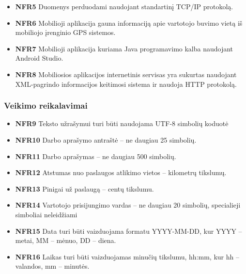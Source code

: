 \documentclass{VUMIFPSbakalaurinis}
\begin{document}
\begin{itemize}
	\item \textbf{NFR5} Duomenys perduodami naudojant standartinį TCP/IP protokolą.
\end{itemize}

\begin{itemize}
	\item \textbf{NFR6} Mobilioji aplikacija gauna informaciją apie vartotojo buvimo vietą iš mobiliojo įrenginio GPS sistemos.
\end{itemize}

\begin{itemize}
	\item \textbf{NFR7} Mobilioji aplikacija kuriama Java programavimo kalba naudojant Android Studio.
	\item \textbf{NFR8} Mobiliosios aplikacijos internetinis servisas yra sukurtas naudojant XML-pagrindo informacijos keitimosi sistema ir naudoja HTTP protokolą.
\end{itemize}

\subsubsection{Veikimo reikalavimai}
\begin{itemize}
	\item \textbf{NFR9} Teksto užrašymui turi būti naudojama UTF-8 simbolių koduotė
	\item \textbf{NFR10} Darbo aprašymo antraštė – ne daugiau 25 simbolių.
	\item \textbf{NFR11} Darbo aprašymas – ne daugiau 500 simbolių.
	\item \textbf{NFR12} Atstumas nuo paslaugos atlikimo vietos – kilometrų tikslumų.
	\item \textbf{NFR13} Pinigai už paslaugą – centų tikslumu.
	\item \textbf{NFR14} Vartotojo prisijungimo vardas – ne daugiau 20 simbolių, specialieji simboliai neleidžiami
	\item \textbf{NFR15} Data turi būti vaizduojama formatu YYYY-MM-DD, kur YYYY – metai, MM – mėnuo, DD – diena.
	\item \textbf{NFR16} Laikas turi būti vaizduojamas minučių tikslumu, hh:mm, kur hh – valandos, mm – minutės.
\end{itemize}
\end{document}
